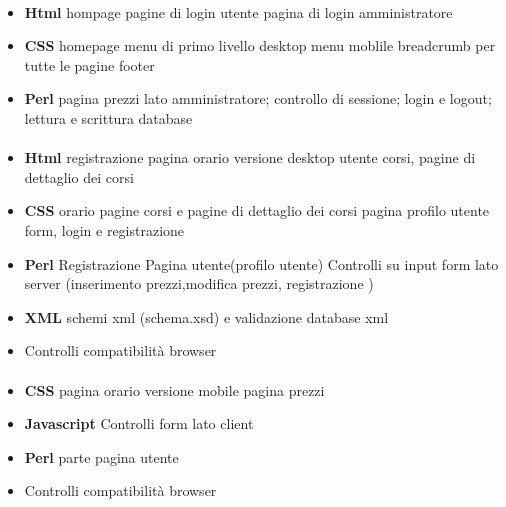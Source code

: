 \documentclass[12pt,a4paper]{article}
\begin{document}
\paragraph{\LB{}}
\begin{itemize}
	\item \textbf{Html}
	\subitem hompage
	\subitem pagine di login utente 
	\subitem pagina di login amministratore
	\item\textbf{CSS}
	\subitem homepage
	\subitem menu di primo livello desktop
	\subitem menu moblile 
	\subitem breadcrumb per tutte le pagine
	\subitem footer
	\item \textbf{Perl}
	\subitem pagina prezzi lato amministratore;
	\subitem controllo di sessione;
	\subitem login e logout;
	\subitem lettura e scrittura database
\end{itemize}
\paragraph{\AB{}}
\begin{itemize}
	\item \textbf{Html}
	\subitem registrazione
	\subitem pagina orario versione desktop
	\subitem utente
	\subitem corsi, pagine di dettaglio dei corsi
	\item \textbf{CSS}
	\subitem orario
	\subitem pagine corsi e pagine di dettaglio dei corsi
	\subitem pagina profilo utente
	\subitem form, login e registrazione
	\item \textbf{Perl}
	\subitem Registrazione 
	\subitem Pagina utente(profilo utente)
	\subitem Controlli su input form lato server (inserimento prezzi,modifica prezzi, registrazione )
	\item\textbf{XML}
	\subitem schemi xml (schema.xsd) e validazione database xml
	\item Controlli compatibilità browser

\end{itemize}
\paragraph{\EC{}}
\begin{itemize}
	\item\textbf{CSS}
	\subitem pagina orario versione mobile
	\subitem pagina prezzi
	\item\textbf{Javascript}
	\subitem Controlli form lato client
	\item\textbf{ Perl}
	\subitem parte pagina utente
	\item Controlli compatibilità browser
\end{itemize}
\end{document}
